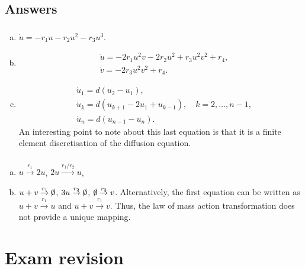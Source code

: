 \documentclass[]{article}
\begin{document}
\begin{Answ}
\subsection{Answers}
\subsubsection{}
\begin{enumerate}[(a)]
\item $\dot{u}=-r_1u-r_2u^2-r_3u^3$.
\item
\begin{align}
&\dot{u}=-2r_1u^2v-2r_2u^2+r_3u^2v^2+r_4,\nonumber\\
&\dot{v}=-2r_3u^2v^2+r_4.\nonumber
\end{align}
\item
\begin{align}
&\dot{u}_1=d(u_2-u_1),\nonumber\\
&\dot{u}_k=d(u_{k+1}-2u_1+u_{k-1}),\quad k=2,\dots,n-1,\nonumber\\
&\dot{u}_n=d(u_{n-1}-u_n).\nonumber
\end{align}
An interesting point to note about this last equation is that it is a finite element discretisation of the diffusion equation.
\end{enumerate}
\subsubsection{}
\begin{enumerate}[(a)]
\item $u\stackrel{r_1}{\rightarrow}2u$, $2u\stackrel{r_1/r_2}{\rightarrow}u$,
\item $u+v\stackrel{r_1}{\rightarrow}\slashed{0}$, $3u\stackrel{r_2}{\rightarrow}\slashed{0}$, $\slashed{0}\stackrel{r_3}{\rightarrow}v$. Alternatively, the first equation can be written as $u+v\stackrel{r_1}{\rightarrow}u$ and $u+v\stackrel{r_1}{\rightarrow}v$. Thus, the law of mass action transformation does not provide a unique mapping.
\end{enumerate}
\end{Answ}
\section*{Exam revision}
\end{document}
